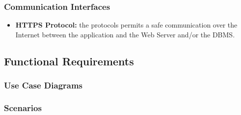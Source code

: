 \documentclass {article}
\begin{document}
	\subsubsection{Communication Interfaces}
	\begin{itemize}
		\item {\bf HTTPS Protocol:} the protocols permits a safe communication over the Internet between the application and the Web Server and/or the DBMS.
	\end{itemize}
	\subsection{Functional Requirements}
	\subsubsection{Use Case Diagrams}
	\subsubsection{Scenarios}
	
\end{document}
